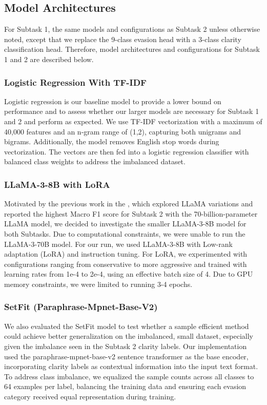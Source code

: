 \documentclass[11pt]{article}
\begin{document}
\subsection{Model Architectures}
For Subtask 1, the same models and configurations as Subtask 2 unless otherwise noted, except that we replace the 9-class evasion head with a 3-class clarity classification head. Therefore, model architectures and configurations for Subtask 1 and 2 are described below.

\subsubsection{Logistic Regression With TF-IDF}
Logistic regression is our baseline model to provide a lower bound on performance and to assess whether our larger models are necessary for Subtask 1 and 2 and perform as expected. We use TF-IDF vectorization with a maximum of 40,000 features and an n-gram range of (1,2), capturing both unigrams and bigrams. Additionally, the model removes English stop words during vectorization. The vectors are then fed into a logistic regression classifier with balanced class weights to address the imbalanced dataset.
\subsubsection{LLaMA-3-8B with LoRA}
Motivated by the previous work in the \citet{thomas2024isaidthatdataset}, which explored LLaMA variations and reported the highest Macro F1 score for Subtask 2 with the 70-billion-parameter LLaMA model, we decided to investigate the smaller LLaMA-3-8B model for both Subtasks. Due to computational constraints, we were unable to run the LLaMA-3-70B model. For our run, we used LLaMA-3-8B with Low-rank adaptation (LoRA) and instruction tuning. For LoRA, we experimented with configurations ranging from conservative to more aggressive and trained with learning rates from 1e-4 to 2e-4, using an effective batch size of 4. Due to GPU memory constraints, we were limited to running 3-4 epochs.


\subsubsection{SetFit (Paraphrase-Mpnet-Base-V2)}
We also evaluated the SetFit model to test whether a sample efficient method could achieve better generalization on the imbalanced, small dataset, especially given the imbalance seen in the Subtask 2 clarity labels. Our implementation used the paraphrase-mpnet-base-v2 sentence transformer as the base encoder, incorporating clarity labels as contextual information into the input text format. To address class imbalance, we equalized the sample counts across all classes to 64 examples per label, balancing the training data and ensuring each evasion category received equal representation during training.
\end{document}
